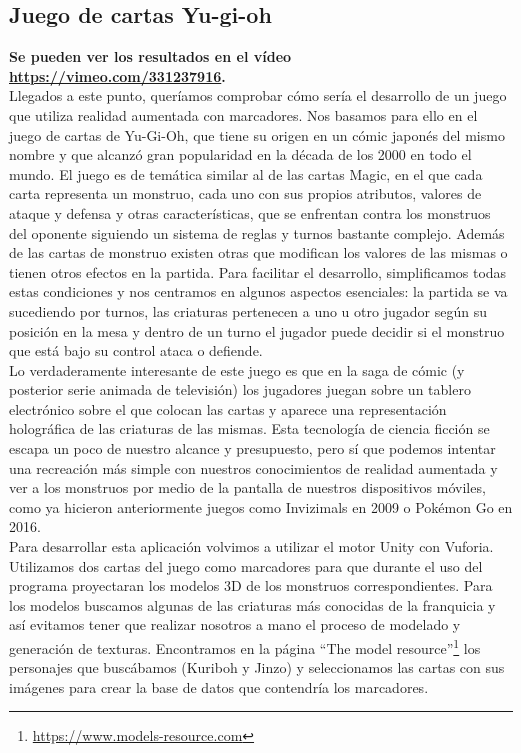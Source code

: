 \subsection{Juego de cartas Yu-gi-oh}

\textbf{Se pueden ver los resultados en el vídeo \url{https://vimeo.com/331237916}.}\\

Llegados a este punto, queríamos comprobar cómo sería el desarrollo de un juego que utiliza realidad aumentada con marcadores. Nos basamos para ello en el juego de cartas de Yu-Gi-Oh, que tiene su origen en un cómic japonés del mismo nombre y que alcanzó gran popularidad en la década de los 2000 en todo el mundo. El juego es de temática similar al de las cartas Magic, en el que cada carta representa un monstruo, cada uno con sus propios atributos, valores de ataque y defensa y otras características, que se enfrentan contra los monstruos del oponente siguiendo un sistema de reglas y turnos bastante complejo. Además de las cartas de monstruo existen otras que modifican los valores de las mismas o tienen otros efectos en la partida. Para facilitar el desarrollo, simplificamos todas estas condiciones y nos centramos en algunos aspectos esenciales: la partida se va sucediendo por turnos, las criaturas pertenecen a uno u otro jugador según su posición en la mesa y dentro de un turno el jugador puede decidir si el monstruo que está bajo su control ataca o defiende.\\

Lo verdaderamente interesante de este juego es que en la saga de cómic (y posterior serie animada de televisión) los jugadores juegan sobre un tablero electrónico sobre el que colocan las cartas y aparece una representación holográfica de las criaturas de las mismas. Esta tecnología de ciencia ficción se escapa un poco de nuestro alcance y presupuesto, pero sí que podemos intentar una recreación más simple con nuestros conocimientos de realidad aumentada y ver a los monstruos por medio de la pantalla de nuestros dispositivos móviles, como ya hicieron anteriormente juegos como Invizimals en 2009 o Pokémon Go en 2016.\\

Para desarrollar esta aplicación volvimos a utilizar el motor Unity con Vuforia. Utilizamos dos cartas del juego como marcadores para que durante el uso del programa proyectaran los modelos 3D de los monstruos correspondientes. Para los modelos buscamos algunas de las criaturas más conocidas de la franquicia y así evitamos tener que realizar nosotros a mano el proceso de modelado y generación de texturas. Encontramos en la página ``The model resource''\footnote{ \url{https://www.models-resource.com}} los personajes que buscábamos (Kuriboh y Jinzo) y seleccionamos las cartas con sus imágenes para crear la base de datos que contendría los marcadores.\\

